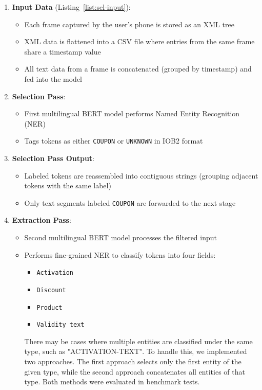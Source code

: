 \documentclass[licencjacka,en]{pracamgr}
\begin{document}
\begin{enumerate}
    \item \textbf{Input Data} (Listing~\ref{list:sel-input}):
    \begin{itemize}
        \item Each frame captured by the user's phone is stored as an XML tree
        \item XML data is flattened into a CSV file where entries from the same frame share a timestamp value
        \item All text data from a frame is concatenated (grouped by timestamp) and fed into the model
    \end{itemize}
    
    \item \textbf{Selection Pass}:
    \begin{itemize}
        \item First multilingual BERT model performs Named Entity Recognition (NER)
        \item Tags tokens as either \texttt{COUPON} or \texttt{UNKNOWN} in IOB2 format~\cite{iob2}
    \end{itemize}
    
    \item \textbf{Selection Pass Output}:
    \begin{itemize}
        \item Labeled tokens are reassembled into contiguous strings (grouping adjacent tokens with the same label)
        \item Only text segments labeled \texttt{COUPON} are forwarded to the next stage
    \end{itemize}
    
    \item \textbf{Extraction Pass}:
    \begin{itemize}
        \item Second multilingual BERT model processes the filtered input
        \item Performs fine-grained NER to classify tokens into four fields:
        \begin{itemize}
            \item \texttt{Activation}
            \item \texttt{Discount}
            \item \texttt{Product}
            \item \texttt{Validity text}
        \end{itemize}
        There may be cases where multiple entities are classified under the same type, such as "ACTIVATION-TEXT". To handle this, we implemented two approaches. The first approach selects only the first entity of the given type, while the second approach concatenates all entities of that type. Both methods were evaluated in benchmark tests.
    \end{itemize}
    

\end{enumerate}
\end{document}
